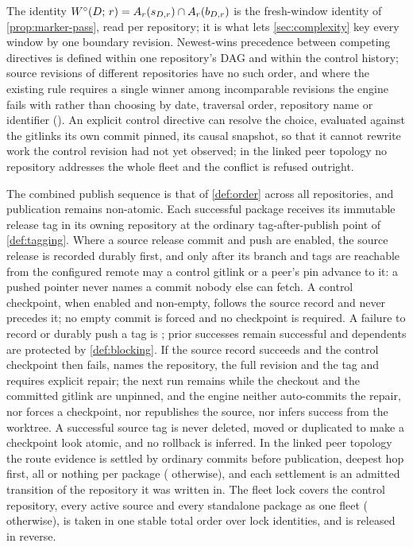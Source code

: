 The identity $W^{\circ}(D;\,r) = A_{r}(s_{D,r}) \cap A_{r}(b_{D,r})$
is the fresh-window identity of \cref{prop:marker-pass}, read per
repository; it is what lets \cref{sec:complexity} key every window by one
boundary revision. Newest-wins precedence between competing directives is
defined within one repository's DAG and within the control history; source
revisions of different repositories have no such order, and where the
existing rule requires a single winner among incomparable revisions the
engine fails with  rather than choosing by date, traversal order,
repository name or identifier (). An explicit control directive can
resolve the choice, evaluated against the gitlinks its own commit pinned, its
causal snapshot, so that it cannot rewrite work the control revision had not
yet observed; in the linked peer topology no repository addresses the whole
fleet and the conflict is refused outright.

\begin{definition}
\label{def:exec-recording}
The combined publish sequence is that of \cref{def:order} across all
repositories, and publication remains non-atomic. Each successful package
receives its immutable release tag in its owning repository at the ordinary
tag-after-publish point of \cref{def:tagging}. Where a source release commit
and push are enabled, the source release is recorded durably first, and only
after its branch and tags are reachable from the configured remote may a
control gitlink or a peer's pin advance to it: a pushed pointer never names a
commit nobody else can fetch. A control checkpoint, when enabled and
non-empty, follows the source record and never precedes it; no empty commit
is forced and no checkpoint is required. A failure to record or durably push
a tag is ; prior successes remain successful and dependents are
protected by \cref{def:blocking}. If the source record succeeds and the
control checkpoint then fails,  names the repository, the full
revision and the tag and requires explicit repair; the next run remains
 while the checkout and the committed gitlink are unpinned, and
the engine neither auto-commits the repair, nor forces a checkpoint, nor
republishes the source, nor infers success from the worktree. A successful
source tag is never deleted, moved or duplicated to make a checkpoint look
atomic, and no rollback is inferred. In the linked peer topology the route
evidence is settled by ordinary commits before publication, deepest hop
first, all or nothing per package ( otherwise), and each
settlement is an admitted transition of the repository it was written in.
The fleet lock covers the control repository, every active source and every
standalone package as one fleet ( otherwise), is taken in one
stable total order over lock identities, and is released in reverse.
\end{definition}

